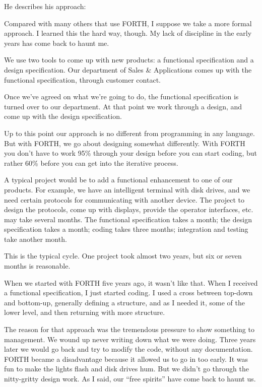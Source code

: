 He describes his approach:
\begin{tfquot}
Compared with many others that use FORTH, I suppose we take a more
formal approach. I learned this the hard way, though. My lack of discipline
in the early years has come back to haunt me.

We use two tools to come up with new products: a functional specification
and a design specification. Our department of Sales \& Applications comes
up with the functional specification, through customer contact.

Once we've agreed on what we're going to do, the functional specification is
turned over to our department. At that point we work through a design,
and come up with the design specification.

Up to this point our approach is no different from programming in any
language. But with FORTH, we go about designing somewhat differently.
With FORTH you don't have to work 95\% through your design before you
can start coding, but rather 60\% before you can get into the iterative
process.


A typical project would be to add a functional enhancement to one of
our products. For example, we have an intelligent terminal with disk
drives, and we need certain protocols for communicating with another
device. The project to design the protocols, come up with displays,
provide the operator interfaces, etc. may take several months. The
functional specification takes a month; the design specification takes
a month; coding takes three months; integration and testing take
another month.

This is the typical cycle. One project took almost two years, but six
or seven months is reasonable.

When we started with FORTH five years ago, it wasn't like that. When I
received a functional specification, I just started coding. I used a
cross between top-down and bottom-up, generally defining a structure,
and as I needed it, some of the lower level, and then returning with
more structure.

The reason for that approach was the tremendous pressure to show
something to management. We wound up never writing down what we were
doing. Three years later we would go back and try to modify the code,
without any documentation. FORTH became a disadvantage because it
allowed us to go in too early. It was fun to make the lights flash and
disk drives hum. But we didn't go through the nitty-gritty design
work. As I said, our ``free spirits'' have come back to haunt us.


\end{tfquot}
